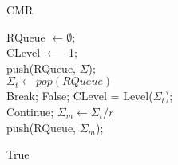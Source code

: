 \IncMargin{1em}
\begin{algorithm}\label{alg_prqa}
	{\small
		\caption{CMR}
		RQueue $\leftarrow \emptyset$;\\
		CLevel $\leftarrow$ -1;\\
		push(RQueue, $\Sigma$);\\
		
		{
			$\Sigma_t \leftarrow pop(RQueue)$\\
			{
				Break;
			}
			{
				{
					\Return False;
				}
				CLevel = Level($\Sigma_t$);\\
				Continue;
			}
			{
				$\Sigma_m \leftarrow \Sigma_t / r$\\
				push(RQueue, $\Sigma_m$);\\
			}  
		}
		
		\Return True
	}
	\vspace*{-1mm}
\end{algorithm}
\DecMargin{1em}
